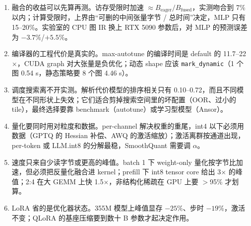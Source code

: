 \documentclass[11pt,a4paper]{ctexart}
\begin{document}
\begin{enumerate}
\item 融合的收益可以先算再测。访存受限时加速 $\approx B_{\text{eager}}/B_{\text{fused}}$，实测吻合到 7\% 以内；计算受限时，上界由“可删的中间张量字节 / 总时间”决定，MLP 只有 15--20\%。实验室的 CPU 图 IR 换上 RTX 5090 参数后，对 MLP 的预测误差为 $-3.7\%$/$+5.5\%$。
\item 编译器的工程代价是真实的。max-autotune 的编译时间是 default 的 11.7--22$\times$，CUDA graph 对大张量是负优化；动态 shape 应该 \texttt{mark\_dynamic}（1 个图 0.54 s，静态策略要 8 个图 4.46 s）。
\item 调度搜索离不开实测。解析代价模型的排序相关只有 0.10--0.72，而且不同模型在不同形状上失效；它们适合剪掉搜索空间里的坏配置（OOR、过小的 tile），最终选择要靠 benchmark（autotune）或学习型模型（Ansor）。
\item 量化要同时用对粒度和数据。per-channel 解决权重的重尾，int4 以下必须用数据（GPTQ 的 Hessian 补偿、AWQ 的激活缩放）；激活离群按通道出现，per-token 或 LLM.int8 的分解最稳，SmoothQuant 需要调 $\alpha$。
\item 速度只来自少读字节或更高的峰值。batch 1 下 weight-only 量化按字节比加速，但必须把反量化融合进 kernel；prefill 下 int8 tensor core 给出 3$\times$ 的峰值；2:4 在大 GEMM 上快 1.5$\times$，非结构化稀疏在 GPU 上要 $>$95\% 才划算。
\item LoRA 省的是优化器状态。355M 模型上峰值显存 $-25\%$、步时 $-19\%$，激活不变；QLoRA 的基座压缩要到数十 B 参数才起决定作用。
\end{enumerate}
\end{document}
